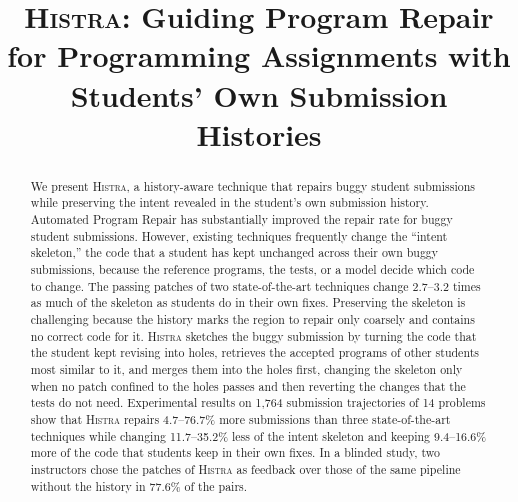 \documentclass[10pt,conference]{IEEEtran}
\begin{document}
\title{\textsc{Histra}: Guiding Program Repair for Programming Assignments with Students' Own Submission Histories}

\author{\IEEEauthorblockN{}
\IEEEauthorblockA{}}

\maketitle

\begin{abstract}
We present \textsc{Histra}, a history-aware technique that repairs buggy student submissions while preserving the intent revealed in the student's own submission history. Automated Program Repair has substantially improved the repair rate for buggy student submissions. However, existing techniques frequently change the ``intent skeleton,'' the code that a student has kept unchanged across their own buggy submissions, because the reference programs, the tests, or a model decide which code to change. The passing patches of two state-of-the-art techniques change 2.7--3.2 times as much of the skeleton as students do in their own fixes. Preserving the skeleton is challenging because the history marks the region to repair only coarsely and contains no correct code for it. \textsc{Histra} sketches the buggy submission by turning the code that the student kept revising into holes, retrieves the accepted programs of other students most similar to it, and merges them into the holes first, changing the skeleton only when no patch confined to the holes passes and then reverting the changes that the tests do not need. Experimental results on 1,764 submission trajectories of 14 problems show that \textsc{Histra} repairs 4.7--76.7\% more submissions than three state-of-the-art techniques while changing 11.7--35.2\% less of the intent skeleton and keeping 9.4--16.6\% more of the code that students keep in their own fixes. In a blinded study, two instructors chose the patches of \textsc{Histra} as feedback over those of the same pipeline without the history in 77.6\% of the pairs.

\end{abstract}
\end{document}
